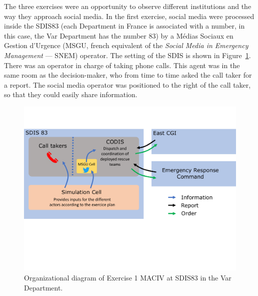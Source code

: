 The three exercises were an opportunity to observe different institutions and the way they approach social media.
In the first exercise, social media were processed inside the SDIS83 (each Department in
France is associated with a number, in this case, the Var Department has the number 83)
by a Médias Sociaux en Gestion d’Urgence (MSGU, french equivalent of the \textit{Social Media in Emergency Management} — SNEM) operator.
The setting of the SDIS is shown in Figure~\ref{information:sdis83}.
There was an operator in charge of taking phone calls.
This agent was in the same room as the decision-maker, who from time to time asked the call taker for a report.
The social media operator was positioned to the right of the call taker, so that they could easily share information.

\begin{figure}[htb]
    \centering
    \includegraphics[width=\textwidth]{figures/chap-3/SDIS83.pdf}
    \caption{Organizational diagram of Exercise 1 MACIV at SDIS83 in the Var Department.}
    \label{information:sdis83}
\end{figure}

